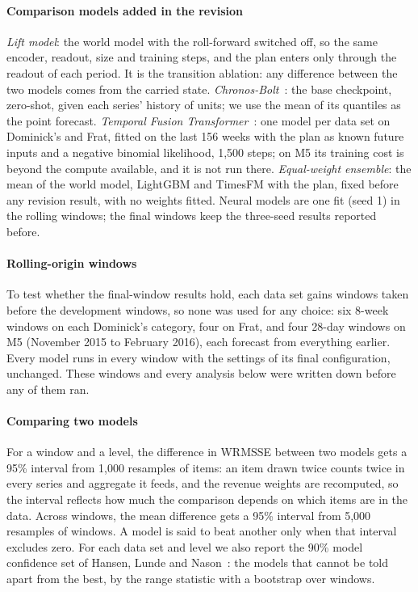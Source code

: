 
\paragraph{Comparison models added in the revision}
\emph{Lift model}: the world model with the roll-forward switched off, so the
same encoder, readout, size and training steps, and the plan enters only
through the readout of each period. It is the transition ablation: any
difference between the two models comes from the carried state.
\emph{Chronos-Bolt}~\cite{chronos}: the base checkpoint, zero-shot, given each
series' history of units; we use the mean of its quantiles as the point
forecast. \emph{Temporal Fusion Transformer}~\cite{tft}: one model per data
set on Dominick's and Frat, fitted on the last 156 weeks with the plan as
known future inputs and a negative binomial likelihood, 1,500 steps; on M5 its
training cost is beyond the compute available, and it is not run there.
\emph{Equal-weight ensemble}: the mean of the world model, LightGBM and
TimesFM with the plan, fixed before any revision result, with no weights
fitted. Neural models are one fit (seed 1) in the rolling windows; the final
windows keep the three-seed results reported before.

\paragraph{Rolling-origin windows}
To test whether the final-window results hold, each data set gains windows
taken before the development windows, so none was used for any choice:
six 8-week windows on each Dominick's category, four on Frat, and four 28-day
windows on M5 (November 2015 to February 2016), each forecast from everything
earlier. Every model runs in every window with the settings of its final
configuration, unchanged. These windows and every analysis below were written
down before any of them ran.

\paragraph{Comparing two models}
For a window and a level, the difference in WRMSSE between two models gets a
95\% interval from 1,000 resamples of items: an item drawn twice counts twice
in every series and aggregate it feeds, and the revenue weights are recomputed,
so the interval reflects how much the comparison depends on which items are
in the data. Across windows, the mean difference gets a 95\% interval from
5,000 resamples of windows. A model is said to beat another only when that
interval excludes zero. For each data set and level we also report the 90\%
model confidence set of Hansen, Lunde and Nason~\cite{hansen2011}: the models
that cannot be told apart from the best, by the range statistic with a
bootstrap over windows.

